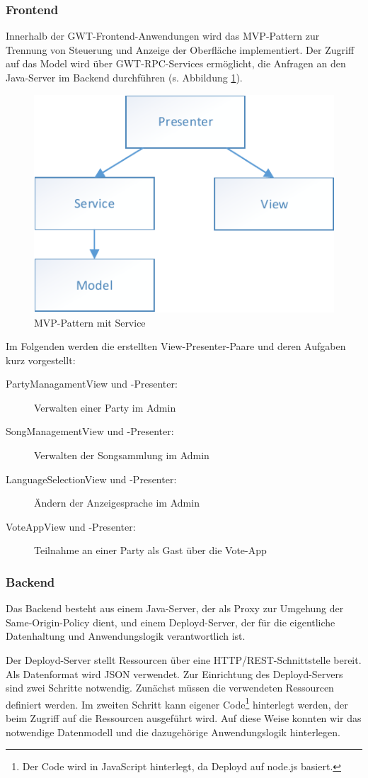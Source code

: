 \subsubsection{Frontend}
Innerhalb der GWT-Frontend-Anwendungen wird das MVP-Pattern zur Trennung von Steuerung und Anzeige
der Oberfläche implementiert. Der Zugriff auf das Model wird über GWT-RPC-Services ermöglicht, die Anfragen an den Java-Server im Backend durchführen (s. Abbildung \ref{fig:MVP-mit-Service}).

\begin{figure}[tbh]
\centering
\includegraphics[width=0.6\linewidth]{Bilder/MVP-mit-Service}
\caption{MVP-Pattern mit Service}
\label{fig:MVP-mit-Service}
\end{figure}

Im Folgenden werden die erstellten View-Presenter-Paare und deren Aufgaben kurz vorgestellt:
\begin{description}
	\item[PartyManagamentView und -Presenter:] Verwalten einer Party im Admin
	\item[SongManagementView und -Presenter:] Verwalten der Songsammlung im Admin
	\item[LanguageSelectionView und -Presenter:] Ändern der Anzeigesprache im Admin
	\item[VoteAppView und -Presenter:] Teilnahme an einer Party als Gast über die Vote-App
\end{description}

\subsubsection{Backend}
Das Backend besteht aus einem Java-Server, der als Proxy zur Umgehung der Same-Origin-Policy dient, und einem Deployd-Server, der für die eigentliche Datenhaltung und Anwendungslogik verantwortlich ist.

Der Deployd-Server stellt Ressourcen über eine HTTP/REST-Schnittstelle bereit. Als
Datenformat wird JSON verwendet. Zur Einrichtung des Deployd-Servers sind zwei Schritte
notwendig. Zunächst müssen die verwendeten Ressourcen definiert werden. Im zweiten
Schritt kann eigener Code\footnote{Der Code wird in JavaScript hinterlegt, da Deployd auf node.js basiert.} hinterlegt werden, der beim Zugriff auf die Ressourcen
ausgeführt wird. Auf diese Weise konnten wir das notwendige Datenmodell und die
dazugehörige Anwendungslogik hinterlegen.

